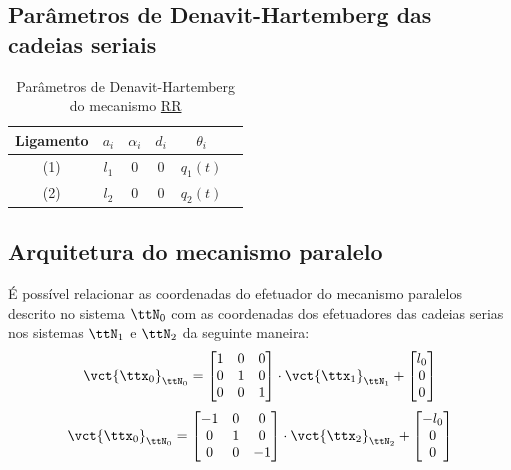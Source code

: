 \documentclass[]{politex}
\begin{document}
\subsection{Parâmetros de Denavit-Hartemberg das cadeias seriais}

\begin{table}[H]
\begin{center}
\caption{Parâmetros de Denavit-Hartemberg do mecanismo \underline{R}\underline{R}}
\begin{tabular}{|c|c|c|c|c|c|} 
	\hline
	\rule[-2mm]{0mm}{6mm}
	Ligamento & $a_i$ & $\alpha_i$ & $d_i$ & $\theta_i$ \\
	\hline
	\rule[-2mm]{0mm}{6mm}
	(1) & $l_1$ & $0$ & $0$ & $q_1(t)$  \\
	\rule[-1mm]{0mm}{5mm}
	(2) & $l_2$ & $0$ & $0$ & $q_2(t)$  \\
	\hline
\end{tabular}
\label{tab:DH}
\end{center}
\end{table}

\subsection{Arquitetura do mecanismo paralelo}

É possível relacionar as coordenadas do efetuador do mecanismo paralelos descrito no sistema $\ttN_0$ com as coordenadas dos efetuadores das cadeias serias nos sistemas $\ttN_1$ e $\ttN_2$ da seguinte maneira:
\begin{equation}
\vct{\ttx_0}_{\ttN_0} = \begin{bmatrix}
1 & 0 & 0 \\
0 & 1 & 0 \\
0 & 0 & 1 \\
\end{bmatrix}
\cdot
\vct{\ttx_1}_{\ttN_1}
+
\begin{bmatrix}
l_0 \\
0 \\
0 
\end{bmatrix}
\end{equation}
\begin{equation}
\vct{\ttx_0}_{\ttN_0} = \begin{bmatrix}
-1 & 0 & 0 \\
0 & 1 & 0 \\
0 & 0 & -1 \\
\end{bmatrix}
\cdot
\vct{\ttx_2}_{\ttN_2}
+
\begin{bmatrix}
-l_0 \\
0 \\
0 
\end{bmatrix}
\end{equation}
\end{document}
